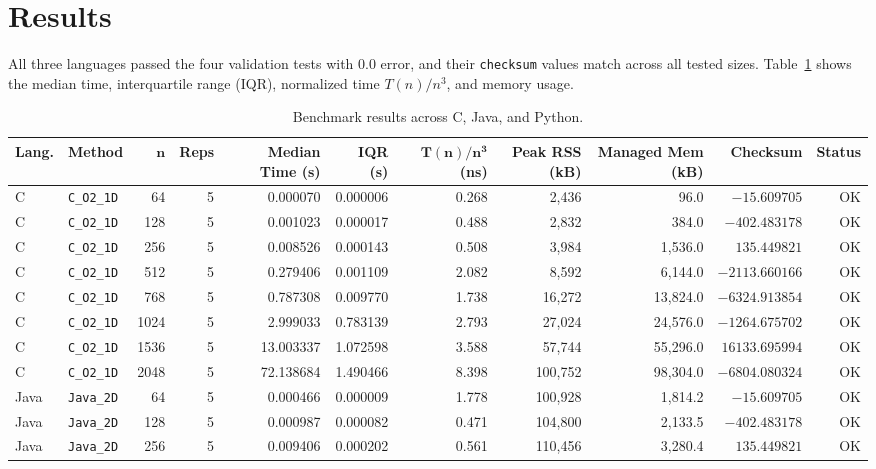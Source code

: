 \documentclass[11pt,a4paper]{article}
\begin{document}
\section{Results}
All three languages passed the four validation tests with 0.0 error, and their \texttt{checksum} values match across all tested sizes. Table~\ref{tab:results} shows the median time, interquartile range (IQR), normalized time $T(n)/n^3$, and memory usage.

\begin{table}[H]
\centering
\caption{Benchmark results across C, Java, and Python.}
\label{tab:results}
\scriptsize
\setlength{\tabcolsep}{4pt}
\begin{tabular}{llrrrrrrrrr}
\toprule
\textbf{Lang.} & \textbf{Method} & $\mathbf{n}$ & \textbf{Reps} & \textbf{Median Time (s)} & \textbf{IQR (s)} & $\mathbf{T(n)/n^3}$ \textbf{(ns)} & \textbf{Peak RSS (kB)} & \textbf{Managed Mem (kB)} & \textbf{Checksum} & \textbf{Status} \\
\midrule
C & \texttt{C\_O2\_1D} & 64 & 5 & 0.000070 & 0.000006 & 0.268 & 2,436 & 96.0 & $-15.609705$ & OK \\
C & \texttt{C\_O2\_1D} & 128 & 5 & 0.001023 & 0.000017 & 0.488 & 2,832 & 384.0 & $-402.483178$ & OK \\
C & \texttt{C\_O2\_1D} & 256 & 5 & 0.008526 & 0.000143 & 0.508 & 3,984 & 1,536.0 & $135.449821$ & OK \\
C & \texttt{C\_O2\_1D} & 512 & 5 & 0.279406 & 0.001109 & 2.082 & 8,592 & 6,144.0 & $-2113.660166$ & OK \\
C & \texttt{C\_O2\_1D} & 768 & 5 & 0.787308 & 0.009770 & 1.738 & 16,272 & 13,824.0 & $-6324.913854$ & OK \\
C & \texttt{C\_O2\_1D} & 1024 & 5 & 2.999033 & 0.783139 & 2.793 & 27,024 & 24,576.0 & $-1264.675702$ & OK \\
C & \texttt{C\_O2\_1D} & 1536 & 5 & 13.003337 & 1.072598 & 3.588 & 57,744 & 55,296.0 & $16133.695994$ & OK \\
C & \texttt{C\_O2\_1D} & 2048 & 5 & 72.138684 & 1.490466 & 8.398 & 100,752 & 98,304.0 & $-6804.080324$ & OK \\
\midrule
Java & \texttt{Java\_2D} & 64 & 5 & 0.000466 & 0.000009 & 1.778 & 100,928 & 1,814.2 & $-15.609705$ & OK \\
Java & \texttt{Java\_2D} & 128 & 5 & 0.000987 & 0.000082 & 0.471 & 104,800 & 2,133.5 & $-402.483178$ & OK \\
Java & \texttt{Java\_2D} & 256 & 5 & 0.009406 & 0.000202 & 0.561 & 110,456 & 3,280.4 & $135.449821$ & OK \\

\end{tabular}
\end{table}
\end{document}
